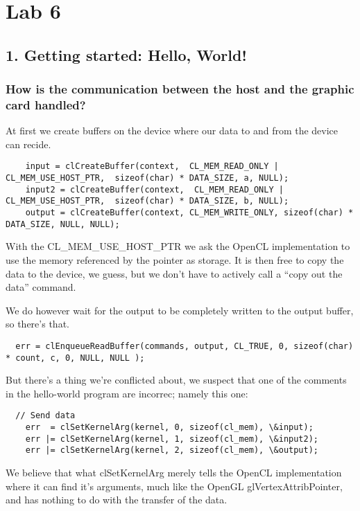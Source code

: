 \documentclass[a4paper,12pt]{article}
\begin{document}
\section{Lab 6}


\subsection{1. Getting started: Hello, World!}

\subsubsection{How is the communication between the host and the graphic card handled?}

At first we create buffers on the device where our data to and from the device can recide.

\begin{lstlisting}
	input = clCreateBuffer(context,  CL_MEM_READ_ONLY | CL_MEM_USE_HOST_PTR,  sizeof(char) * DATA_SIZE, a, NULL);
  	input2 = clCreateBuffer(context,  CL_MEM_READ_ONLY | CL_MEM_USE_HOST_PTR,  sizeof(char) * DATA_SIZE, b, NULL);
	output = clCreateBuffer(context, CL_MEM_WRITE_ONLY, sizeof(char) * DATA_SIZE, NULL, NULL);
\end{lstlisting}

With the CL_MEM_USE_HOST_PTR we ask the OpenCL implementation to use the memory referenced by the pointer as storage. It is then free to copy the data to the device, we guess, but we don't have to actively call a ``copy out the data'' command.

We do however wait for the output to be completely written to the output buffer, so there's that.

\begin{lstlisting}
  err = clEnqueueReadBuffer(commands, output, CL_TRUE, 0, sizeof(char) * count, c, 0, NULL, NULL );
\end{lstlisting}

But there's a thing we're conflicted about, we suspect that one of the comments in the hello-world program are incorrec; namely this one:

\begin{lstlisting}
  // Send data
	err  = clSetKernelArg(kernel, 0, sizeof(cl_mem), \&input);
	err |= clSetKernelArg(kernel, 1, sizeof(cl_mem), \&input2);
	err |= clSetKernelArg(kernel, 2, sizeof(cl_mem), \&output);
\end{lstlisting}

We believe that what clSetKernelArg merely tells the OpenCL implementation where it can find it's arguments, much like the OpenGL glVertexAttribPointer, and has nothing to do with the transfer of the data.
\end{document}
